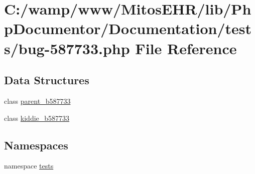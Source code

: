\hypertarget{bug-587733_8php}{\section{\-C\-:/wamp/www/\-Mitos\-E\-H\-R/lib/\-Php\-Documentor/\-Documentation/tests/bug-\/587733.php \-File \-Reference}
\label{bug-587733_8php}
}
\subsection*{\-Data \-Structures}
\begin{DoxyCompactItemize}
\item 
class \hyperlink{classparent__b587733}{parent\-\_\-b587733}
\item 
class \hyperlink{classkiddie__b587733}{kiddie\-\_\-b587733}
\end{DoxyCompactItemize}
\subsection*{\-Namespaces}
\begin{DoxyCompactItemize}
\item 
namespace \hyperlink{namespacetests}{tests}
\end{DoxyCompactItemize}
